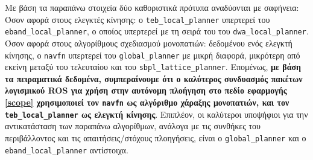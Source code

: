 Με βάση τα παραπάνω στοιχεία δύο καθοριστικά πρότυπα αναδύονται με σαφήνεια:
Όσον αφορά στους ελεγκτές κίνησης: ο \texttt{teb\_local\_planner} υπερτερεί του
\texttt{eband\_local\_planner}, ο οποίος υπερτερεί με τη σειρά του του
\texttt{dwa\_local\_planner}. Όσον αφορά στους αλγορίθμους σχεδιασμού
μονοπατιών: δεδομένου ενός ελεγκτή κίνησης, ο \texttt{navfn} υπερτερεί του
\texttt{global\_planner} με μικρή διαφορά, μικρότερη από εκείνη μεταξύ του
τελευταίου και του \texttt{sbpl\_lattice\_planner}. Επομένως, \textbf{με βάση
τα πειραματικά δεδομένα, συμπεραίνουμε ότι ο καλύτερος συνδυασμός πακέτων
λογισμικού ROS για χρήση στην αυτόνομη πλοήγηση στο πεδίο εφαρμογής \ref{scope}
χρησιμοποιεί τον \texttt{navfn} ως αλγόριθμο χάραξης μονοπατιών, και τον
\texttt{teb\_local\_planner} ως ελεγκτή κίνησης}. Επιπλέον, οι καλύτεροι
υποψήφιοι για την αντικατάσταση των παραπάνω αλγορίθμων, ανάλογα με τις
συνθήκες του περιβάλλοντος και τις απαιτήσεις/στόχους πλοηγήσεις, είναι ο
\texttt{global\_planner} και ο \texttt{eband\_local\_planner} αντίστοιχα.
